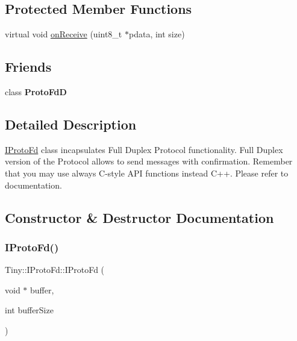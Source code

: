 \subsection*{Protected Member Functions}
\begin{DoxyCompactItemize}
\item 
virtual void \hyperlink{classTiny_1_1IProtoFd_a795b41c969708964cd4646580af1c3ab}{on\+Receive} (uint8\+\_\+t $\ast$pdata, int size)
\end{DoxyCompactItemize}
\subsection*{Friends}
\begin{DoxyCompactItemize}
\item 
\mbox{\label{classTiny_1_1IProtoFd_ac4b680549c66e93cb1996fadcf86d724}} 
class {\bfseries Proto\+FdD}
\end{DoxyCompactItemize}


\subsection{Detailed Description}
\hyperlink{classTiny_1_1IProtoFd}{I\+Proto\+Fd} class incapsulates Full Duplex Protocol functionality. Full Duplex version of the Protocol allows to send messages with confirmation. Remember that you may use always C-\/style A\+PI functions instead C++. Please refer to documentation. 

\subsection{Constructor \& Destructor Documentation}
\mbox{\label{classTiny_1_1IProtoFd_a65976c6faaf41504b7c15036edc054cf}} 
\subsubsection{\texorpdfstring{I\+Proto\+Fd()}{IProtoFd()}}
{\footnotesize\ttfamily Tiny\+::\+I\+Proto\+Fd\+::\+I\+Proto\+Fd (\begin{DoxyParamCaption}\item[{void $\ast$}]{buffer,  }\item[{int}]{buffer\+Size }\end{DoxyParamCaption})\hspace{0.3cm}{\ttfamily [inline]}}

